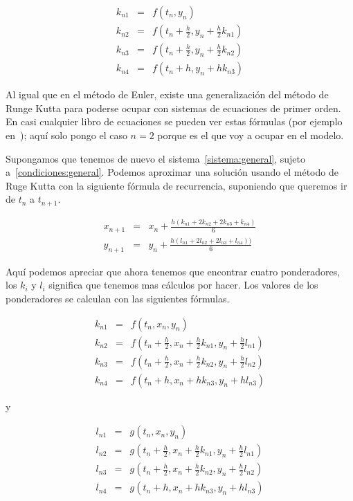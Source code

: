 \begin{eqnarray}
k_{n1} & = & f(t_n, y_n) \nonumber \\
k_{n2} & = & f(t_n + \frac{h}{2}, y_n + \frac{h}{2} k_{n1}) \nonumber \\
k_{n3} & = & f(t_n + \frac{h}{2}, y_n + \frac{h}{2} k_{n2}) \nonumber \\
k_{n4} & = & f(t_n + h, y_n + hk_{n3}) \nonumber
\end{eqnarray}

Al igual que en el método de Euler, existe una generalización del método de Runge Kutta para poderse ocupar con sistemas de ecuaciones de primer orden. En casi cualquier libro de ecuaciones se pueden ver estas fórmulas (por ejemplo en~\cite{Blanchard:Ecuaciones}); aquí solo pongo el caso $n=2$ porque es el que voy a ocupar en el modelo.

Supongamos que tenemos de nuevo el sistema~\ref{sistema:general}, sujeto a~\ref{condiciones:general}. Podemos aproximar una solución usando el método de Ruge Kutta con la siguiente fórmula de recurrencia, suponiendo que queremos ir de $t_n$ a $t_{n+1}$.

\begin{eqnarray}
x_{n+1} & = & x_n + \frac{h(k_{n1} + 2k_{n2} + 2k_{n3} + k_{n4})}{6} \nonumber \\
y_{n+1} & = & y_n + \frac{h(l_{n1} + 2l_{n2} + 2l_{n3} + l_{n4}))}{6} \nonumber
\end{eqnarray}

Aquí podemos apreciar que ahora tenemos que encontrar cuatro ponderadores, los $k_i$ y $l_i$ significa que tenemos mas cálculos por hacer. Los valores de los ponderadores se calculan con las siguientes fórmulas.

\begin{eqnarray}
k_{n1} & = & f(t_n, x_n, y_n) \nonumber \\
k_{n2} & = & f(t_n + \frac{h}{2}, x_n + \frac{h}{2} k_{n1}, y_n + \frac{h}{2}l_{n1}) \nonumber \\
k_{n3} & = & f(t_n + \frac{h}{2}, x_n + \frac{h}{2} k_{n2}, y_n + \frac{h}{2}l_{n2}) \nonumber \\
k_{n4} & = & f(t_n + h, x_n + hk_{n3}, y_n + hl_{n3}) \nonumber
\end{eqnarray}

y

\begin{eqnarray}
l_{n1} & = & g(t_n, x_n, y_n) \nonumber \\
l_{n2} & = & g(t_n + \frac{h}{2}, x_n + \frac{h}{2} k_{n1}, y_n + \frac{h}{2}l_{n1}) \nonumber \\
l_{n3} & = & g(t_n + \frac{h}{2}, x_n + \frac{h}{2} k_{n2}, y_n + \frac{h}{2}l_{n2}) \nonumber \\
l_{n4} & = & g(t_n + h, x_n + hk_{n3}, y_n + hl_{n3}) \nonumber
\end{eqnarray}


